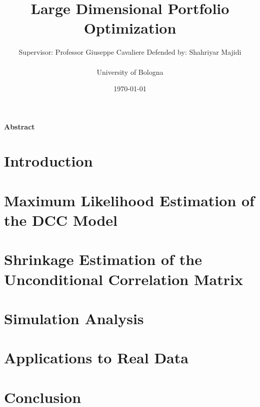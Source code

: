 \documentclass[12pt,a4]{article} %
\title{\textbf{Large Dimensional Portfolio Optimization}}
\author{Supervisor: Professor Giuseppe Cavaliere \quad Defended by: Shahriyar Majidi \\\\ University of Bologna}
\date{\today}
\begin{document}
	
	\maketitle
	
	\begin{center}
		\textbf{Abstract}
	\end{center}
	
	\newpage
	\tableofcontents
	\setcounter{tocdepth}{2} %
	\newpage
	
	\section{Introduction}\label{sec:intro}
	
	\newpage
	
	\section{Maximum Likelihood Estimation of the DCC Model}\label{sec:dcc}
	
	
	\section{Shrinkage Estimation of the Unconditional Correlation Matrix}\label{sec:shrink}
	
	\newpage
	
	\section{Simulation Analysis}\label{sed:simul}
	
	\newpage
	
	\section{Applications to Real Data}\label{sec:empirics}
	
	\newpage
	
	\section{Conclusion}\label{sec:conclusion}
	
	\newpage
	
	\newpage
	\printbibliography[title={References}]
\end{document}
